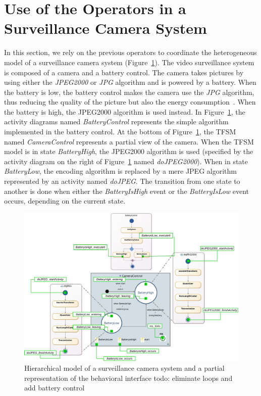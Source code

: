 \section{Use of the Operators in a Surveillance Camera System}
In this section, we rely on the previous operators to coordinate the heterogeneous model of a surveillance camera system (Figure~\ref{fig:camerasystem}). The video surveillance system is composed of a camera and a battery control. The camera takes pictures by using either the \emph{JPEG2000} or \emph{JPG} algorithm and is powered by a battery. When the battery is low, the battery control makes the camera use the \emph{JPG} algorithm, thus reducing the quality of the picture but also the energy consumption~\cite{encodingcomparison}. When the battery is high, the JPEG2000 algorithm is used instead. In Figure~\ref{fig:camerasystem}, the activity diagrams named \emph{BatteryControl} represents the simple algorithm implemented in the battery control. At the bottom of Figure~\ref{fig:camerasystem}, the TFSM named \emph{CameraControl} represents a partial view of the camera. When the TFSM model is in state \emph{BatteryHigh}, the JPEG2000 algorithm is used (specified by the activity diagram on the right of Figure~\ref{fig:camerasystem} named \emph{doJPEG2000}). When in state \emph{BatteryLow}, the encoding algorithm is replaced by a mere JPEG algorithm represented by an activity named \emph{doJPEG}. The transition from one state to another is done when either the \emph{BatteryIsHigh} event or the \emph{BatteryIsLow} event occurs, depending on the current state.	   


\begin{figure}
	\center
	\includegraphics[width=1\columnwidth]{examples/figs/picmodels.pdf}
	\caption{Hierarchical model of a surveillance camera system and a partial representation of the behavioral interface todo: eliminate loops and add battery control}
	\label{fig:camerasystem}
\end{figure}
 

